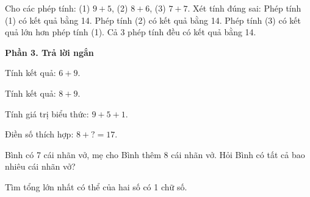 \begin{ex} %
Cho các phép tính: (1) $9 + 5$, (2) $8 + 6$, (3) $7 + 7$. Xét tính đúng sai:
\choiceTF
{\True Phép tính (1) có kết quả bằng 14.}
{\True Phép tính (2) có kết quả bằng 14.}
{Phép tính (3) có kết quả lớn hơn phép tính (1).}
{\True Cả 3 phép tính đều có kết quả bằng 14.}
\end{ex}

\textbf{Phần 3. Trả lời ngắn}

\begin{ex} %
Tính kết quả: $6 + 9$.
\end{ex}

\begin{ex} %
Tính kết quả: $8 + 9$.
\end{ex}

\begin{ex} %
Tính giá trị biểu thức: $9 + 5 + 1$.
\end{ex}

\begin{ex} %
Điền số thích hợp: $8 + ? = 17$.
\end{ex}

\begin{ex} %
Bình có 7 cái nhãn vở, mẹ cho Bình thêm 8 cái nhãn vở. Hỏi Bình có tất cả bao nhiêu cái nhãn vở?
\end{ex}

\begin{ex} %
Tìm tổng lớn nhất có thể của hai số có 1 chữ số.
\end{ex}
